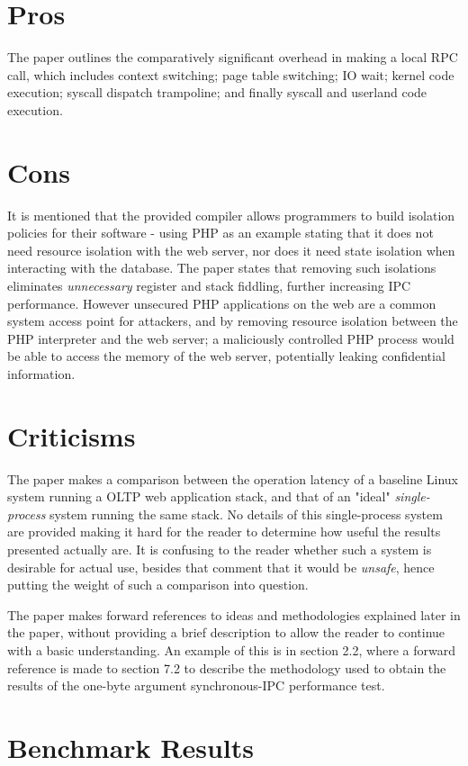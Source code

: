 \documentclass{article}
\begin{document}
\section*{Pros}
The paper outlines the comparatively significant overhead in making a local RPC call, which includes context switching; page table switching; IO wait; kernel code execution; syscall dispatch trampoline; and finally syscall and userland code execution.


\section*{Cons}
It is mentioned that the provided compiler allows programmers to build isolation policies for their software - using PHP as an example stating that it does not need resource isolation with the web server, nor does it need state isolation when interacting with the database. The paper states that removing such isolations eliminates \textit{unnecessary} register and stack fiddling, further increasing IPC performance. However unsecured PHP applications on the web are a common system access point for attackers, and by removing resource isolation between the PHP interpreter and the web server; a maliciously controlled PHP process would be able to access the memory of the web server, potentially leaking confidential information.


\section*{Criticisms}
The paper makes a comparison between the operation latency of a baseline Linux system running a OLTP web application stack, and that of an "ideal" \textit{single-process} system running the same stack. No details of this single-process system are provided making it hard for the reader to determine how useful the results presented actually are. It is confusing to the reader whether such a system is desirable for actual use, besides that comment that it would be \textit{unsafe}, hence putting the weight of such a comparison into question.

The paper makes forward references to ideas and methodologies explained later in the paper, without providing a brief description to allow the reader to continue with a basic understanding. An example of this is in section 2.2, where a forward reference is made to section 7.2 to describe the methodology used to obtain the results of the one-byte argument synchronous-IPC performance test.



\section*{Benchmark Results}

\nocite{*}


\end{document}
